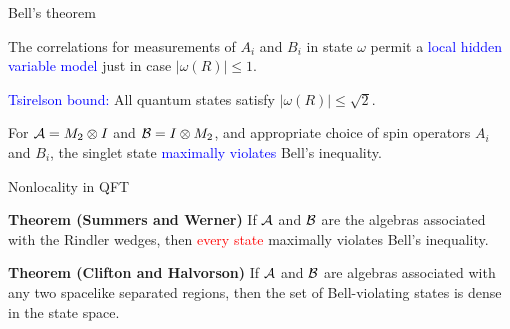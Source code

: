 \documentclass[8pt]{beamer}
\begin{document}
\begin{frame}{Bell's theorem}

  The correlations for measurements of $A_i$ and $B_i$ in state
  $\omega$ permit a \textcolor{blue}{local hidden variable model} just
  in case $|\omega (R)|\leq 1$.

\bigskip \bigskip \textcolor{blue}{Tsirelson bound:} All quantum states satisfy $|\omega (R)|\leq \sqrt{2}$.

\bigskip For $\mathcal A = M_2\otimes I$ and $\mathcal B=I\otimes M_2$, and
appropriate choice of spin operators $A_i$ and $B_i$, the singlet
state \textcolor{blue}{maximally violates} Bell's inequality.

\end{frame}

\begin{frame}{Nonlocality in QFT}

  \textbf{Theorem (Summers and Werner)} If $\mathcal A$ and $\mathcal B$ are the
  algebras associated with the Rindler wedges, then
  \textcolor{red}{every state} maximally violates Bell's inequality.

  \bigskip \bigskip \textbf{Theorem (Clifton and Halvorson)} If $\mathcal A$
  and $\mathcal B$ are algebras associated with any two spacelike separated
  regions, then the set of Bell-violating states is dense in the state
  space.



\end{frame}
\end{document}
